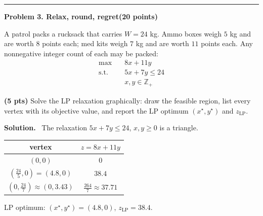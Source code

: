 \documentclass[10pt]{article}
\newcommand{\problem}[2]{%
  \par\bigskip
  {\color{ruleink}\rule{\textwidth}{1pt}}\par\nobreak\vspace{3pt}
  {\large\bfseries #2}\hfill{\normalsize\bfseries(#1 points)}\par\nobreak\vspace{4pt}}
\newenvironment{solution}
  {\par\smallskip\begingroup\color{solink}\textbf{Solution.}\ }
  {\endgroup\par}
\begin{document}
\problem{20}{Problem 3. Relax, round, regret}

A patrol packs a rucksack that carries $W = 24$ kg. Ammo boxes weigh $5$ kg and are
worth $8$ points each; med kits weigh $7$ kg and are worth $11$ points each. Any
nonnegative integer count of each may be packed:
\[
\begin{aligned}
  \max\quad & 8x + 11y \\
  \text{s.t.}\quad & 5x + 7y \le 24 \\
                   & x, y \in \mathbb{Z}_{+}
\end{aligned}
\]

\begin{parts}
\item \textbf{(5 pts)} Solve the LP relaxation graphically: draw the feasible region,
  list every vertex with its objective value, and report the LP optimum
  $(x^{\star}, y^{\star})$ and $z_{\mathrm{LP}}$.

\begin{solution}
The relaxation $5x + 7y \le 24$, $x, y \ge 0$ is a triangle.
\par\medskip
\begin{minipage}{0.5\linewidth}\centering
{}
\end{minipage}%
\begin{minipage}{0.5\linewidth}\centering
\begin{tabular}{c|c}
 vertex & $z = 8x + 11y$ \\ \hline
 $(0,0)$ & $0$ \\
 $(\tfrac{24}{5}, 0) = (4.8, 0)$ & $38.4$ \\
 $(0, \tfrac{24}{7}) \approx (0, 3.43)$ & $\tfrac{264}{7} \approx 37.71$
\end{tabular}
\end{minipage}
\par\medskip
LP optimum: $(x^\star, y^\star) = (4.8, 0)$, $z_{\mathrm{LP}} = 38.4$.
\end{solution}


\end{parts}
\end{document}

